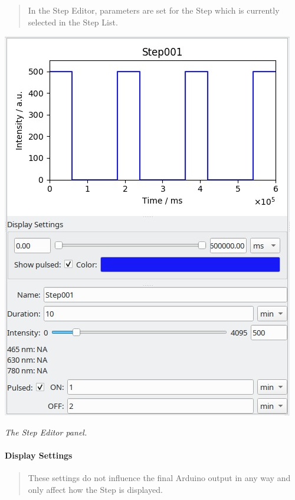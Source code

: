 \begin{quote}
In the Step Editor, parameters are set for the Step which is currently
selected in the Step List.
\end{quote}

\includegraphics{images/stepeditor.jpg}

\emph{The Step Editor panel.}

\hypertarget{display-settings}{%
\paragraph{Display Settings}\label{display-settings}}

\begin{quote}
These settings do not influence the final Arduino output in any way and
only affect how the Step is displayed.
\end{quote}

